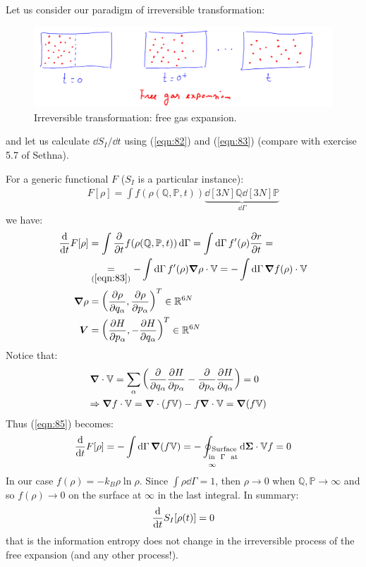 \documentclass[../template.tex]{subfiles}
\begin{document}
\medskip

Let us consider our paradigm of irreversible transformation:

\begin{figure}[H]
    \centering
    \includegraphics{image004.png}
    \caption{Irreversible transformation: free gas expansion.\label{fig:irrev}}
\end{figure}
and let us calculate $\dd{S_I}/\dd{t}$ using (\ref{eqn:82}) and (\ref{eqn:83}) (compare with exercise 5.7 of Sethna).

For a generic functional $F$ ($S_I$ is a particular instance):
\begin{align}\label{eqn:84}
    F[\rho] = \int f(\rho(\mathbb{Q}, \mathbb{P}, t)) \underbrace{\dd[3N]{\mathbb{Q}} \dd[3N]{\mathbb{P}}}_{\dd{\Gamma}} 
\end{align}
we have:
\begin{align}\label{eqn:85}
    \dv{t} F[\rho] &= \int \pdv{t} f(\rho(\mathbb{Q}, \mathbb{P},t)) \dd{\Gamma} = \int \dd{\Gamma} f'(\rho) \pdv{r}{t} =\\ \nonumber
    &\underset{(\ref{eqn:83})}{=} -\int \dd{\Gamma} f'(\rho) \grad \rho \cdot \mathbb{V} = -\int \dd{\Gamma} \grad f(\rho) \cdot \mathbb{V}\\
    \grad \rho &= \left(\pdv{\rho}{q_\alpha}, \pdv{\rho}{p_\alpha}\right)^T \in \mathbb{R}^{6N} \label{eqn:86}\\
    \bm{V} &= \left(\pdv{H}{p_\alpha}, -\pdv{H}{q_\alpha}\right)^T \in \mathbb{R}^{6N} \label{eqn:87}
\end{align}
Notice that:
\begin{align}\label{eqn:88}
    \grad \cdot \bm{\mathbb{V}} = \sum_\alpha \left(\pdv{q_\alpha} \pdv{H}{p_\alpha} - \pdv{p_\alpha} \pdv{H}{q_\alpha}\right) = 0 \\
    \Rightarrow \grad f \cdot \bm{\mathbb{V}} = \grad \cdot (f \bm{\mathbb{V}}) - f \grad \cdot \bm{\mathbb{V}} = \grad (f \bm{\mathbb{V}}) \span \label{eqn:89}
\end{align}
Thus (\ref{eqn:85}) becomes:
\begin{align}\label{eqn:90}
    \dv{t} F[\rho] = -\int \dd{\Gamma} \grad (f \bm{\mathbb{V}}) = - \oint_{\parbox{3em}{$\,\,$\scriptsize Surface in $\Gamma$ at $\infty$}} \dd{\bm{\Sigma}} \cdot \bm{\mathbb{V}} f = 0
\end{align}
In our case $f(\rho) = -k_B \rho \ln \rho$. Since $\int \rho \dd{\Gamma} = 1$, then $\rho \to 0$ when $\mathbb{Q}, \mathbb{P} \to \infty$ and so $f(\rho) \to 0$ on the surface at $\infty$ in the last integral. In summary:
\begin{align}\label{eqn:91}
    \dv{t} S_I[\rho(t)] = 0
\end{align}
that is the information entropy does not change in the irreversible process of the free expansion (and any other process!). 
\end{document}
